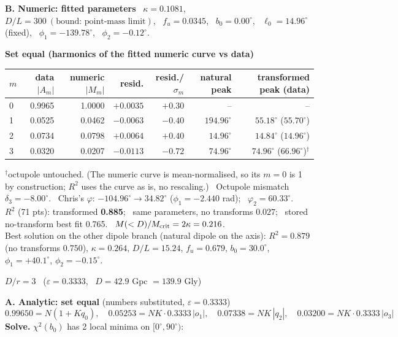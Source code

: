 \documentclass[10pt]{article}
\begin{document}
\medskip\textbf{B. Numeric: fitted parameters} \ $\kappa=0.1081$, \ $D/L=300\ (\text{bound: point-mass limit})$, \ $f_u=0.0345$, \ $b_0=0.00^\circ$, \ $\ell_0=14.96^\circ$ (fixed), \ $\phi_1=-139.78^\circ$, \ $\phi_2=-0.12^\circ$.

\textbf{Set equal (harmonics of the fitted numeric curve vs data)}
\begin{center}\small\begin{tabular}{lrrrrrr}\toprule
$m$ & data $|A_m|$ & numeric $|M_m|$ & resid. & resid./$\sigma_m$ & natural peak & transformed peak (data)\\\midrule
0 & 0.9965 & 1.0000 & $+0.0035$ & $+0.30$ & -- & --\\
1 & 0.0525 & 0.0462 & $-0.0063$ & $-0.40$ & $194.96^\circ$ & $55.18^\circ$ ($55.70^\circ$)\\
2 & 0.0734 & 0.0798 & $+0.0064$ & $+0.40$ & $14.96^\circ$ & $14.84^\circ$ ($14.96^\circ$)\\
3 & 0.0320 & 0.0207 & $-0.0113$ & $-0.72$ & $74.96^\circ$ & $74.96^\circ$ ($66.96^\circ$)$^\dagger$\\
\bottomrule\end{tabular}\end{center}
$^\dagger$octupole untouched. (The numeric curve is mean-normalised, so its $m{=}0$ is 1 by construction; $R^2$ uses the curve as is, no rescaling.) \ Octupole mismatch $\delta_3=-8.00^\circ$. \ Chris's $\varphi$: $-104.96^\circ\to34.82^\circ$ ($\phi_1=-2.440$ rad); \ $\varphi_2=60.33^\circ$.\\
$R^2$ (71 pts): transformed \textbf{0.885}; \ same parameters, no transforms $0.027$; \ stored no-transform best fit 0.765. \ $M(<D)/M_{\rm crit}=2\kappa=0.216$.
\\ Best solution on the other dipole branch (natural dipole on the axis): $R^2=0.879$ (no transforms $0.750$), $\kappa=0.264$, $D/L=15.24$, $f_u=0.679$, $b_0=30.0^\circ$, $\phi_1=+40.1^\circ$, $\phi_2=-0.15^\circ$.

\clearpage
{\large\bfseries\boldmath $D/r=3$} \ ($\varepsilon=0.3333$, \ $D=42.9$ Gpc $=139.9$ Gly)

\textbf{A. Analytic: set equal} (numbers substituted, $\varepsilon=0.3333$)
\[ 0.99650=N(1+Kq_0),\quad 0.05253=NK\cdot0.3333\,|o_1|,\quad 0.07338=NK\,|q_2|,\quad 0.03200=NK\cdot0.3333\,|o_3| \]
\textbf{Solve.} $\chi^2(b_0)$ has 2 local minima on $[0^\circ,90^\circ)$:
\end{document}

